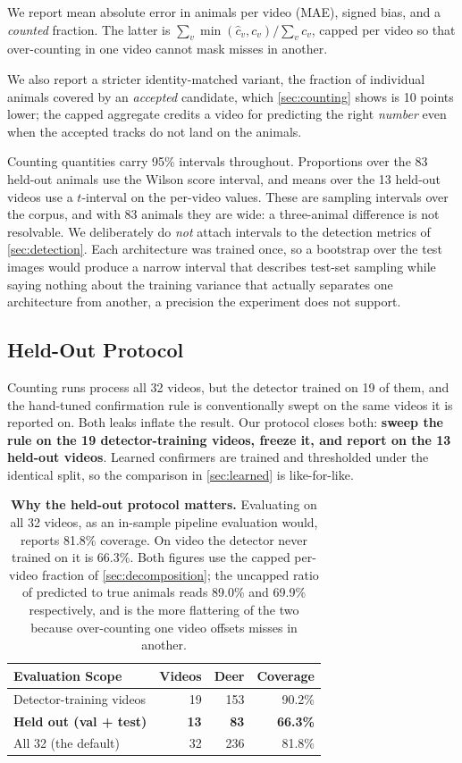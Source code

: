 We report mean absolute error in animals per video (MAE), signed bias, and a \emph{counted}
fraction. The latter is $\sum_v \min(\hat{c}_v, c_v) / \sum_v c_v$, capped per video so that
over-counting in one video cannot mask misses in another.

We also report a stricter identity-matched variant, the fraction of individual animals
covered by an \emph{accepted} candidate, which \cref{sec:counting} shows is 10 points
lower; the capped aggregate credits a video for predicting the right \emph{number} even
when the accepted tracks do not land on the animals.

Counting quantities carry 95\% intervals throughout. Proportions over the 83 held-out animals
use the Wilson score interval, and means over the 13 held-out videos use a $t$-interval on the
per-video values. These are sampling intervals over the corpus, and with 83 animals they are
wide: a three-animal difference is not resolvable. We deliberately do \emph{not} attach
intervals to the detection metrics of \cref{sec:detection}. Each architecture was trained
once, so a bootstrap over the test images would produce a narrow interval that describes
test-set sampling while saying nothing about the training variance that actually separates one
architecture from another, a precision the experiment does not support.

\subsection{Held-Out Protocol}
\label{sec:heldout}

Counting runs process all 32 videos, but the detector trained on 19 of them, and the
hand-tuned confirmation rule is conventionally swept on the same videos it is reported on.
Both leaks inflate the result. Our protocol closes both: \textbf{sweep the rule on the 19
detector-training videos, freeze it, and report on the 13 held-out videos}. Learned
confirmers are trained and thresholded under the identical split, so the comparison in
\cref{sec:learned} is like-for-like.

\begin{table}[H]
\caption{\textbf{Why the held-out protocol matters.} Evaluating on all 32 videos, as an in-sample pipeline evaluation would, reports 81.8\% coverage. On video the detector never trained on
it is 66.3\%. Both figures use the capped per-video fraction of \cref{sec:decomposition}; the
uncapped ratio of predicted to true animals reads 89.0\% and 69.9\% respectively, and is the
more flattering of the two because over-counting one video offsets misses in another.\label{tab:leak}}
\centering
\begin{tabularx}{\textwidth}{lRRR}
\toprule
\textbf{Evaluation Scope} & \textbf{Videos} & \textbf{Deer} & \textbf{Coverage} \\
\midrule
Detector-training videos & 19 & 153 & 90.2\% \\
\textbf{Held out (val + test)} & \textbf{13} & \textbf{83} & \textbf{66.3\%} \\
All 32 (the default) & 32 & 236 & 81.8\% \\
\bottomrule
\end{tabularx}
\end{table}

